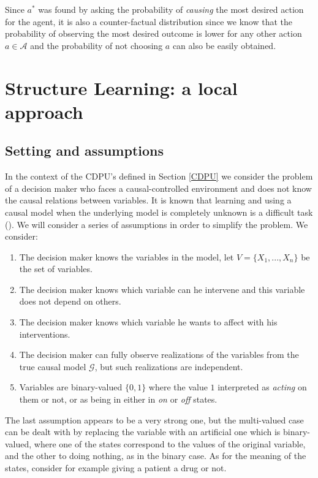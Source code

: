 \documentclass[letterpaper]{article}
\begin{document}
Since $a^\ast$ was found by asking the probability of \textit{causing} the most desired action for the agent, it is also a counter-factual distribution since we know that the probability of observing the most desired outcome is lower for any other action $a \in \mathcal{A}$ and the probability of not choosing $a$ can also be easily obtained.

\section{Structure Learning: a local approach}
\subsection{Setting and assumptions}
In the context of the CDPU's defined in Section \ref{CDPU} we consider the problem of a decision maker who faces a causal-controlled environment and does not know the causal relations between variables. It is known that learning and using a causal model when the underlying model is completely unknown is a difficult task (\cite{lattimoreNIPS2016}). We will consider a series of assumptions in order to simplify the problem. We consider:
\begin{enumerate}
\item The decision maker knows the variables in the model, let $V=\{ X_1,...,X_n \}$ be the set of variables.
\item The decision maker knows which variable can he intervene and this variable does not depend on others.
\item The decision maker knows which variable he wants to affect with his interventions. 
\item The decision maker can fully observe realizations of the variables from the true causal model $\mathcal{G}$, but such realizations are independent.
\item Variables are binary-valued $\{0,1 \}$ where the value $1$ interpreted as \textit{acting} on them or not, or as being in either in \textit{on} or \textit{off} states.
\end{enumerate}
The last assumption appears to be a very strong one, but the multi-valued case can be dealt with by replacing the variable with an artificial one which is binary-valued, where one of the states correspond to the values of the original variable, and the other to doing nothing, as in the binary case. As for the meaning of the states, consider for example giving a patient a drug or not.
\end{document}
